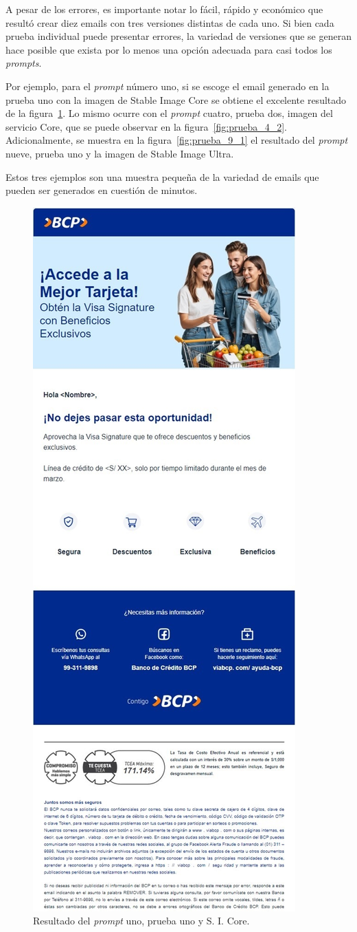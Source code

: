 A pesar de los errores, es importante notar lo fácil, rápido y económico que resultó crear diez emails con tres versiones distintas de cada uno. Si bien cada prueba individual puede presentar errores, la variedad de versiones que se generan hace posible que exista por lo menos una opción adecuada para casi todos los \textit{prompts}. 

Por ejemplo, para el \textit{prompt} número uno, si se escoge el email generado en la prueba uno con la imagen de Stable Image Core se obtiene el excelente resultado de la figura~\ref{fig:prueba_1_1}. Lo mismo ocurre con el \textit{prompt} cuatro, prueba dos, imagen del servicio Core, que se puede observar en la figura~\ref{fig:prueba_4_2}. Adicionalmente, se muestra en la figura~\ref{fig:prueba_9_1} el resultado del \textit{prompt} nueve, prueba uno y la imagen de Stable Image Ultra. 

Estos tres ejemplos son una muestra pequeña de la variedad de emails que pueden ser generados en cuestión de minutos.

\begin{figure}[H]
    \centering
    \includegraphics[width=0.6\linewidth]{Figures/Prueba_1_1_core.JPG}
    \caption{Resultado del \textit{prompt} uno, prueba uno y S. I. Core.}
    \label{fig:prueba_1_1}
\end{figure}

